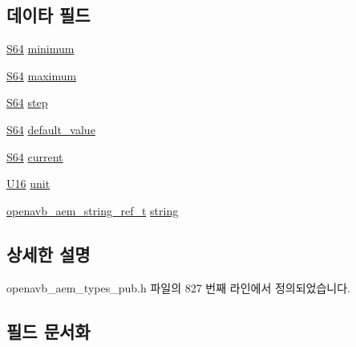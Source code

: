 \subsection*{데이타 필드}
\begin{DoxyCompactItemize}
\item 
\hyperlink{openavb__types__base__pub_8h_a1d293e5c494dd6826239b02f5fe98e7f}{S64} \hyperlink{structopenavb__aem__control__value__format__control__linear__int64__t_af46686d54f4ec5fb3130a5815335ad2f}{minimum}
\item 
\hyperlink{openavb__types__base__pub_8h_a1d293e5c494dd6826239b02f5fe98e7f}{S64} \hyperlink{structopenavb__aem__control__value__format__control__linear__int64__t_a5dcc05dc84954f4a4e6a37cc374edb04}{maximum}
\item 
\hyperlink{openavb__types__base__pub_8h_a1d293e5c494dd6826239b02f5fe98e7f}{S64} \hyperlink{structopenavb__aem__control__value__format__control__linear__int64__t_a4445d6ebf15d54a7e82432819ae52de1}{step}
\item 
\hyperlink{openavb__types__base__pub_8h_a1d293e5c494dd6826239b02f5fe98e7f}{S64} \hyperlink{structopenavb__aem__control__value__format__control__linear__int64__t_a38e377dec0c139c1de98b944589364c3}{default\+\_\+value}
\item 
\hyperlink{openavb__types__base__pub_8h_a1d293e5c494dd6826239b02f5fe98e7f}{S64} \hyperlink{structopenavb__aem__control__value__format__control__linear__int64__t_a8bd9d9f8e16139df84732f7cfe593fa1}{current}
\item 
\hyperlink{openavb__types__base__pub_8h_a0a0a322d5fa4a546d293a77ba8b4a71f}{U16} \hyperlink{structopenavb__aem__control__value__format__control__linear__int64__t_a0b3ff376c10369016824076deacc055e}{unit}
\item 
\hyperlink{structopenavb__aem__string__ref__t}{openavb\+\_\+aem\+\_\+string\+\_\+ref\+\_\+t} \hyperlink{structopenavb__aem__control__value__format__control__linear__int64__t_a1f81001cefa769cb3651172fd5ab0748}{string}
\end{DoxyCompactItemize}


\subsection{상세한 설명}


openavb\+\_\+aem\+\_\+types\+\_\+pub.\+h 파일의 827 번째 라인에서 정의되었습니다.



\subsection{필드 문서화}
